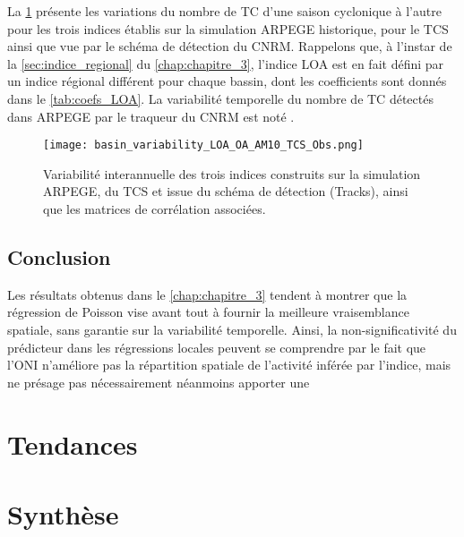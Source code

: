 \documentclass[../main.tex]{subfiles}
\begin{document}
La \cref{fig:variability_ONI} présente les variations du nombre de TC d'une saison cyclonique à l'autre pour les trois indices établis sur la simulation ARPEGE
historique, pour le TCS ainsi que vue par le schéma de détection du CNRM. Rappelons que, à l'instar de la \cref{sec:indice_regional} du
\cref{chap:chapitre_3}, l'indice LOA est en fait défini par un indice régional différent pour chaque bassin, dont les coefficients sont donnés dans le
\cref{tab:coefs_LOA}. La variabilité temporelle du nombre de TC détectés dans ARPEGE par le traqueur du CNRM est noté .

\begin{figure}[p]
    \centering
    \texttt{[image: basin\_variability\_LOA\_OA\_AM10\_TCS\_Obs.png]}
    \caption{Variabilité interannuelle des trois indices construits sur la simulation ARPEGE, du TCS et issue du schéma de détection (Tracks), ainsi que les
    matrices de corrélation associées.}
    \label{fig:variability_ONI}
\end{figure}

\subsection{Conclusion}

Les résultats obtenus dans le \cref{chap:chapitre_3} tendent à montrer que la régression de Poisson vise avant tout à fournir la meilleure vraisemblance
spatiale, sans garantie sur la variabilité temporelle. Ainsi, la non-significativité du prédicteur dans les régressions locales peuvent se comprendre par le
fait que l'ONI n'améliore pas la répartition spatiale de l'activité inférée par l'indice, mais ne présage pas nécessairement néanmoins apporter une

\section{Tendances}

\section{Synthèse}
\end{document}

